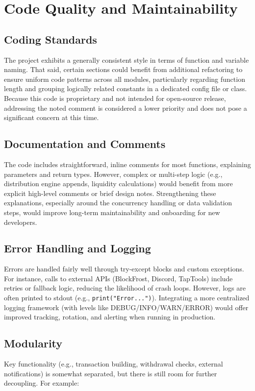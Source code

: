 \documentclass[11pt,a4paper]{report}
\begin{document}
\chapter{Code Quality and Maintainability}

\section{Coding Standards}
The project exhibits a generally consistent style in terms of function and variable naming. That said, certain sections could benefit from additional refactoring to ensure uniform code patterns across all modules, particularly regarding function length and grouping logically related constants in a dedicated config file or class. Because this code is proprietary and not intended for open-source release, addressing the noted comment is considered a lower priority and does not pose a significant concern at this time.

\section{Documentation and Comments}
The code includes straightforward, inline comments for most functions, explaining parameters and return types. However, complex or multi-step logic (e.g., distribution engine appends, liquidity calculations) would benefit from more explicit high-level comments or brief design notes. Strengthening these explanations, especially around the concurrency handling or data validation steps, would improve long-term maintainability and onboarding for new developers.

\section{Error Handling and Logging}
Errors are handled fairly well through try-except blocks and custom exceptions. For instance, calls to external APIs (BlockFrost, Discord, TapTools) include retries or fallback logic, reducing the likelihood of crash loops. However, logs are often printed to stdout (e.g., \texttt{print("Error...")}). Integrating a more centralized logging framework (with levels like DEBUG/INFO/WARN/ERROR) would offer improved tracking, rotation, and alerting when running in production.

\section{Modularity}
Key functionality (e.g., transaction building, withdrawal checks, external notifications) is somewhat separated, but there is still room for further decoupling. For example:
\end{document}
